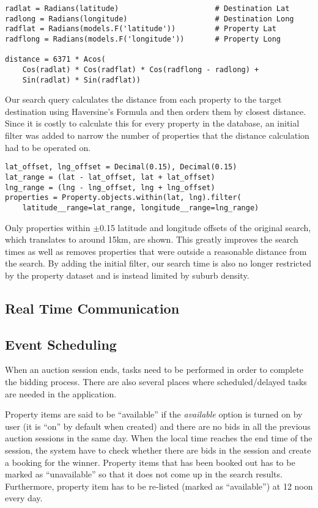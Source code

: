 \begin{lstlisting}[caption={Haversine's Formula}]
radlat = Radians(latitude)                      # Destination Lat
radlong = Radians(longitude)                    # Destination Long
radflat = Radians(models.F('latitude'))	        # Property Lat
radflong = Radians(models.F('longitude'))       # Property Long

distance = 6371 * Acos(
    Cos(radlat) * Cos(radflat) * Cos(radflong - radlong) +
    Sin(radlat) * Sin(radflat))
\end{lstlisting}

Our search query calculates the distance from each property to the target
destination using Haversine's Formula and then orders them by closest distance.
Since it is costly to calculate this for every property in the database, an
initial filter was added to narrow the number of properties that the
distance calculation had to be operated on.

\begin{lstlisting}[caption={Initial filter to narrow search results}]
lat_offset, lng_offset = Decimal(0.15), Decimal(0.15)
lat_range = (lat - lat_offset, lat + lat_offset)
lng_range = (lng - lng_offset, lng + lng_offset)
properties = Property.objects.within(lat, lng).filter(
    latitude__range=lat_range, longitude__range=lng_range)
\end{lstlisting}

Only properties within $\pm$0.15 latitude and longitude offsets of the original
search, which translates to around 15km, are shown. This greatly improves the
search times as well as removes properties that were outside a reasonable distance
from the search. By adding the initial filter, our search time is also no longer
restricted by the property dataset and is instead limited by suburb density.


\subsection{Real Time Communication}
\subsection{Event Scheduling}
When an auction session ends, tasks need to be performed in order to complete
the bidding process. There are also several places where scheduled/delayed tasks
are needed in the application.

Property items are said to be ``available'' if the \emph{available} option is
turned on by user (it is ``on'' by default when created) and there are no bids
in all the previous auction sessions in the same day. When the local time
reaches the end time of the session, the system have to check whether there are
bids in the session and create a booking for the winner. Property items that has
been booked out has to be marked as ``unavailable'' so that it does not come up
in the search results. Furthermore, property item has to be re-listed (marked
as ``available'') at 12 noon every day.

